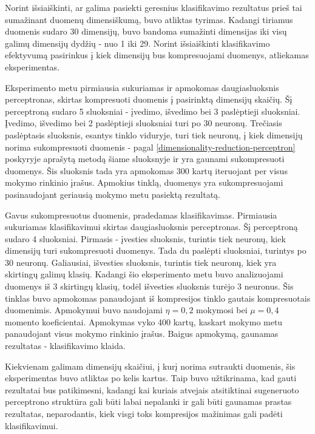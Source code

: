 \documentclass{VUMIFPSbakalaurinis}
\begin{document}
Norint išsiaiškinti, ar galima pasiekti geresnius klasifikavimo rezultatus prieš tai sumažinant duomenų dimensiškumą, buvo atliktas tyrimas.
Kadangi tiriamus duomenis sudaro 30 dimensijų, buvo bandoma sumažinti dimensijas iki visų galimų dimensijų dydžių - nuo 1 iki 29.
Norint išsiaiškinti klasifikavimo efektyvumą pasirinkus į kiek dimensijų bus kompresuojami duomenys, atliekamas eksperimentas.

Eksperimento metu pirmiausia sukuriamas ir apmokomas daugiasluoksnis perceptronas, skirtas kompresuoti duomenis į pasirinktą dimensijų skaičių.
Šį perceptroną sudaro 5 sluoksniai - įvedimo, išvedimo bei 3 paslėptieji sluoksniai.
Įvedimo, išvedimo bei 2 paslėptieji sluoksniai turi po 30 neuronų.
Trečiasis paslėptasis sluoksnis, esantys tinklo viduryje, turi tiek neuronų, į kiek dimensijų norima sukompresuoti duomenis - pagal \ref{dimensionality-reduction-perceptron} poskyryje aprašytą metodą šiame sluoksnyje ir yra gaunami sukompresuoti duomenys.
Šis sluoksnis tada yra apmokomas 300 kartų iteruojant per visus mokymo rinkinio įrašus.
Apmokius tinklą, duomenys yra sukompresuojami pasinaudojant geriausią mokymo metu pasiektą rezultatą.

Gavus sukompresuotus duomenis, pradedamas klasifikavimas.
Pirmiausia sukuriamas klasifikavimui skirtas daugiasluoksnis perceptronas.
Šį perceptroną sudaro 4 sluoksniai.
Pirmasis - įvesties sluoksnis, turintis tiek neuronų, kiek dimensijų turi sukompresuoti duomenys.
Tada du paslėpti sluoksniai, turintys po 30 neuronų.
Galiausiai, išvesties sluoksnis, turintis tiek neuronų, kiek yra skirtingų galimų klasių.
Kadangi šio eksperimento metu buvo analizuojami duomenys iš 3 skirtingų klasių, todėl išvesties sluoksnis turėjo 3 neuronus.
Šis tinklas buvo apmokomas panaudojant iš kompresijos tinklo gautais kompresuotais duomenimis.
Apmokymui buvo naudojami $\eta = 0,2$ mokymosi bei $\mu = 0,4$ momento koeficientai.
Apmokymas vyko 400 kartų, kaskart mokymo metu panaudojant visus mokymo rinkinio įrašus.
Baigus apmokymą, gaunamas rezultatas - klasifikavimo klaida.

Kiekvienam galimam dimensijų skaičiui, į kurį norima sutraukti duomenis, šis eksperimentas buvo atliktas po kelis kartus.
Taip buvo užtikrinama, kad gauti rezultatai bus patikimesni, kadangi kai kuriais atvejais atsitiktinai sugeneruoto perceptrono struktūra gali būti labai nepalanki ir gali būti gaunamas prastas rezultatas, neparodantis, kiek visgi toks kompresijos mažinimas gali padėti klasifikavimui.
\end{document}

